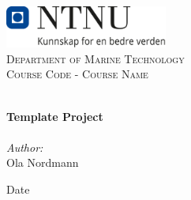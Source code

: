 
\begin{titlepage}
\vbox{ }
\vbox{ }
\begin{center}
\includegraphics[width=0.40\textwidth]{LaTeX/Images/NTNU_logo.png}\\[1cm]
\textsc{\LARGE Department of Marine Technology}\\[1.5cm]
\textsc{\Large Course Code - Course Name}\\[0.5cm]
\vbox{ }

\HRule \\[0.4cm]
{ \huge \bfseries Template Project}\\[0.4cm]
\HRule \\[1.5cm]

\large
\emph{Author:}\\
Ola Nordmann
\vfill

{\large Date}
\end{center}
\end{titlepage}